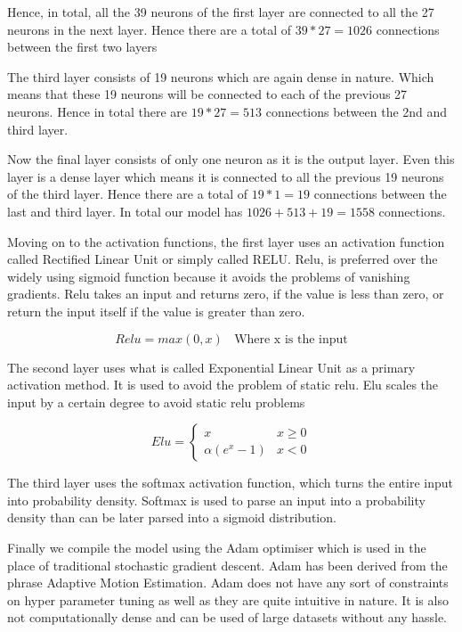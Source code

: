 \documentclass[12pt]{article}
\newcommand{\nd}{\noindent}
\begin{document}
\nd Hence, in total, all the 39 neurons of the first layer are connected to all the 27 neurons in the next layer. Hence there are a total of $39*27=1026$ connections between the first two layers

\nd The third layer consists of 19 neurons which are again dense in nature. Which means that these 19 neurons will be connected to each of the previous 27 neurons. Hence in total there are $19*27=513$  connections between the 2nd and third layer. 

\nd Now the final layer consists of only one neuron as it is the output layer. Even this layer is a dense layer which means it is connected to all the previous 19 neurons of the third layer. Hence there are a total of $19*1=19$ connections between the last and third layer. In total our model has $1026+513+19=1558$ connections. 

\nd Moving on to the activation functions, the first layer uses an activation function called Rectified Linear Unit or simply called RELU. Relu, is preferred over the widely using sigmoid function because it avoids the problems of vanishing gradients. Relu takes an input and returns zero, if the value is less than zero, or return the input itself if the value is greater than zero. 

\begin{equation}
Relu = max(0,x)  \,\,\,\,\ \text{Where x is the input}
\end{equation}

\nd The second layer uses what is called Exponential Linear Unit as a primary activation method. It is used to avoid the problem of static relu. Elu scales the input by a certain degree to avoid static relu problems 

\begin{equation}
Elu = 
\begin{cases}
x & x\geq 0 \\
\alpha(e^{x}-1) & x < 0
\end{cases}
\end{equation}

\nd The third layer uses the softmax activation function, which turns the entire input into probability density. Softmax is used to parse an input into a probability density than can be later parsed into a sigmoid distribution. 

\nd Finally we compile the model using the Adam optimiser which is used in the place of traditional stochastic gradient descent. Adam has been derived from the phrase Adaptive Motion Estimation. Adam does not have any sort of constraints on hyper parameter tuning as well as they are quite intuitive in nature. It is also not computationally  dense and can be used of large datasets without any hassle. 
\end{document}
